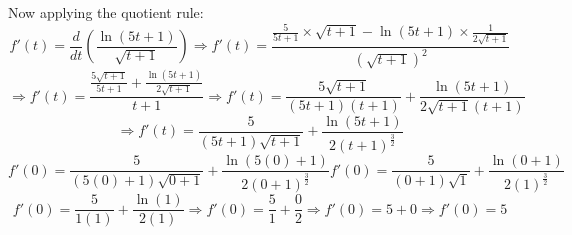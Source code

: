 \documentclass{article}
\begin{document}
\begin{enumerate}
Now applying the quotient rule:
\[f'(t) = \frac{d}{dt}\left(\frac{\ln(5t + 1)}{\sqrt{t + 1}}\right)
    \Longrightarrow f'(t) = \frac{\frac{5}{5t + 1}\times\sqrt{t + 1} -
    \ln(5t + 1)\times\frac{1}{2\sqrt{t + 1}}}{{(\sqrt{t + 1})}^{2}}\]
\[\Longrightarrow f'(t) = \frac{\frac{5\sqrt{t + 1}}{5t + 1} + \frac{\ln(5t + 1)}{2\sqrt{t + 1}}}{t + 1}
    \Longrightarrow f'(t) = \frac{5\sqrt{t + 1}}{(5t + 1)(t + 1)} + \frac{\ln(5t + 1)}{2\sqrt{t + 1}(t + 1)}\]
\[\Longrightarrow f'(t) = \frac{5}{(5t + 1)\sqrt{t + 1}} + \frac{\ln(5t + 1)}{2{(t + 1)}^{\frac{3}{2}}}\]
\[f'(0) = \frac{5}{(5(0) + 1)\sqrt{0 + 1}} + \frac{\ln(5(0) + 1)}{2{(0 + 1)}^{\frac{3}{2}}}
    f'(0) = \frac{5}{(0 + 1)\sqrt{1}} + \frac{\ln(0 + 1)}{2{(1)}^{\frac{3}{2}}}\]
\[f'(0) = \frac{5}{1(1)} + \frac{\ln(1)}{2(1)}
    \Longrightarrow f'(0) = \frac{5}{1} + \frac{0}{2} \Longrightarrow f'(0) = 5 + 0 \Longrightarrow f'(0) = 5\]
\end{enumerate}
\end{document}
